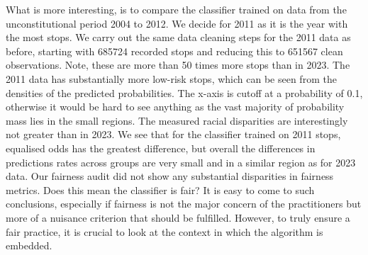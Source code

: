 What is more interesting, is to compare the classifier trained on data from the unconstitutional period 2004 to 2012. We decide for 2011 as it is the year with the most stops.
We carry out the same data cleaning steps for the 2011 data as before, starting with 685724 recorded stops and reducing this to 651567 clean observations. Note, these are more than 50 times more stops than in 2023.
The 2011 data has substantially more low-risk stops, which can be seen from the densities of the predicted probabilities. The x-axis is cutoff at a probability of 0.1, otherwise it would be hard to see anything as the vast majority of probability mass lies in the small regions.
The measured racial disparities are interestingly not greater than in 2023. We see that for the classifier trained on 2011 stops, equalised odds has the greatest difference, but overall the differences in predictions rates across groups are very small and in a similar region as for 2023 data. 
Our fairness audit did not show any substantial disparities in fairness metrics. Does this mean the classifier is fair?
It is easy to come to such conclusions, especially if fairness is not the major concern of the practitioners but more of a nuisance criterion that should be fulfilled. However, to truly ensure a fair practice, it is crucial to look at the context in which the algorithm is embedded.






